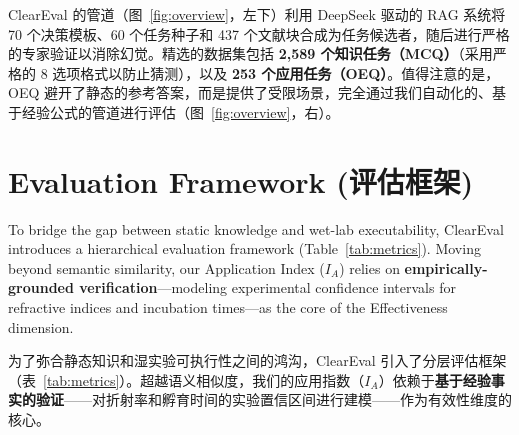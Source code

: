 \documentclass[runningheads]{llncs}
\begin{document}
ClearEval 的管道（图~\ref{fig:overview}，左下）利用 DeepSeek 驱动的 RAG 系统将 70 个决策模板、60 个任务种子和 437 个文献块合成为任务候选者，随后进行严格的专家验证以消除幻觉。精选的数据集包括 \textbf{2,589 个知识任务（MCQ）}（采用严格的 8 选项格式以防止猜测），以及 \textbf{253 个应用任务（OEQ）}。值得注意的是，OEQ 避开了静态的参考答案，而是提供了受限场景，完全通过我们自动化的、基于经验公式的管道进行评估（图~\ref{fig:overview}，右）。

\section{Evaluation Framework (评估框架)}

To bridge the gap between static knowledge and wet-lab executability, ClearEval introduces a hierarchical evaluation framework (Table~\ref{tab:metrics}). Moving beyond semantic similarity, our Application Index ($I_A$) relies on \textbf{empirically-grounded verification}—modeling experimental confidence intervals for refractive indices and incubation times—as the core of the Effectiveness dimension.

为了弥合静态知识和湿实验可执行性之间的鸿沟，ClearEval 引入了分层评估框架（表~\ref{tab:metrics}）。超越语义相似度，我们的应用指数（$I_A$）依赖于\textbf{基于经验事实的验证}——对折射率和孵育时间的实验置信区间进行建模——作为有效性维度的核心。
\end{document}
